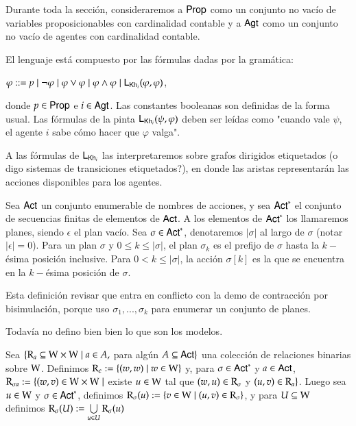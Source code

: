 Durante toda la sección, consideraremos a ${\rm \sf Prop}$ como un conjunto no vacío de variables proposicionables con cardinalidad contable y a ${\rm \sf Agt}$ como un conjunto no vacío de agentes con cardinalidad contable. 

\begin{definicion}
    El lenguaje \KHilogic está compuesto por las fórmulas dadas por la gramática:
    \begin{center}
        $\varphi ::= p \mid \neg \varphi \mid \varphi \vee \varphi \mid \varphi \wedge \varphi \mid \mathsf{L}_{\mathsf{Kh}_i}(\varphi,\varphi)$,
    \end{center}
    donde $p \in {\rm \sf Prop}$ e $i \in {\rm \sf Agt}$. Las constantes booleanas son definidas de la forma usual. Las fórmulas de la pinta $\mathsf{L}_{\mathsf{Kh}_i}(\psi, \varphi)$ deben ser leídas como "cuando vale $\psi$, el agente $i$ sabe cómo hacer que $\varphi$ valga".
\end{definicion}

A las fórmulas de $\mathsf{L}_{\mathsf{Kh}_i}$ las interpretaremos sobre grafos dirigidos etiquetados (o digo sistemas de transiciones etiquetados?), en donde las aristas representarán las acciones disponibles para los agentes.

\begin{definicion}
    Sea ${\rm \sf Act}$ un conjunto enumerable de nombres de acciones, y sea ${\rm \sf Act}^*$ el conjunto de secuencias finitas de elementos de ${\rm \sf Act}$. A los elementos de ${\rm \sf Act}^*$ los llamaremos planes, siendo $\epsilon$ el plan vacío. Sea $\sigma \in {\rm \sf Act}^*$, denotaremos $|\sigma|$ al largo de $\sigma$ (notar $|\epsilon| = 0$). Para un plan $\sigma$ y $0 \leq k \leq |\sigma|$, el plan $\sigma_k$ es el prefijo de $\sigma$ hasta la $k-$ésima posición inclusive. Para $0 < k \leq |\sigma|$, la acción $\sigma[k]$ es la que se encuentra en la $k-$ésima posición de $\sigma$.  
\end{definicion}

Esta definición revisar que entra en conflicto con la demo de contracción por bisimulación, porque uso $\sigma_1,...,\sigma_k$ para enumerar un conjunto de planes.

Todavía no defino bien bien lo que son los modelos.

\begin{definicion}
    Sea $\{\mathrm{R}_a \subseteq \mathrm{W} \times \mathrm{W} \mid a \in A,$ para algún $A \subseteq {\rm \sf Act} \}$ una colección de relaciones binarias sobre $\mathrm{W}$. Definimos $\mathrm{R}_\epsilon := \{(w,w) \mid w \in \mathrm{W}\}$ y, para $\sigma \in {\rm \sf Act}^*$ y $a \in {\rm \sf Act}$, $\mathrm{R}_{\sigma a} := \{(w,v) \in \mathrm{W} \times \mathrm{W} \mid$ existe $u \in \mathrm{W}$ tal que $(w,u) \in \mathrm{R}_\sigma$ y $(u,v) \in \mathrm{R}_a \}$. Luego sea $u \in \mathrm{W}$ y $\sigma \in {\rm \sf Act}^*$, definimos $\mathrm{R}_\sigma(u) := \{v\in\mathrm{W} \mid (u,v) \in \mathrm{R}_\sigma\}$, y para $U\subseteq\mathrm{W}$ definimos $\mathrm{R}_\sigma(U) := \bigcup\limits_{u \in U} \mathrm{R}_\sigma(u)$
\end{definicion}
